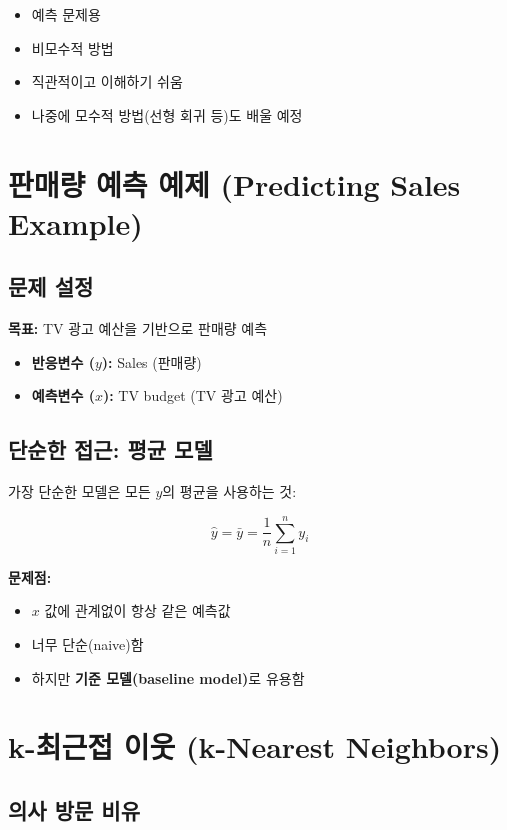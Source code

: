 \documentclass[12pt,a4paper]{article}
\begin{document}
\begin{itemize}
    \item 예측 문제용
    \item 비모수적 방법
    \item 직관적이고 이해하기 쉬움
    \item 나중에 모수적 방법(선형 회귀 등)도 배울 예정
\end{itemize}

\section{판매량 예측 예제 (Predicting Sales Example)}

\subsection{문제 설정}

\textbf{목표:} TV 광고 예산을 기반으로 판매량 예측

\begin{itemize}
    \item \textbf{반응변수 ($y$):} Sales (판매량)
    \item \textbf{예측변수 ($x$):} TV budget (TV 광고 예산)
\end{itemize}

\subsection{단순한 접근: 평균 모델}

가장 단순한 모델은 모든 $y$의 평균을 사용하는 것:

\begin{equation}
\hat{y} = \bar{y} = \frac{1}{n}\sum_{i=1}^{n}y_i
\end{equation}

\textbf{문제점:}
\begin{itemize}
    \item $x$ 값에 관계없이 항상 같은 예측값
    \item 너무 단순(naive)함
    \item 하지만 \textbf{기준 모델(baseline model)}로 유용함
\end{itemize}

\section{k-최근접 이웃 (k-Nearest Neighbors)}

\subsection{의사 방문 비유}
\end{document}

